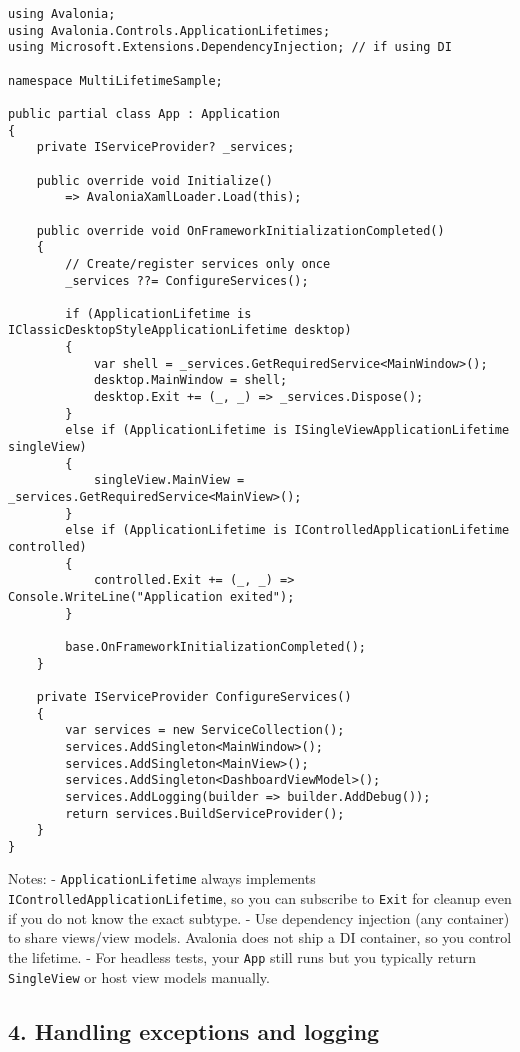 \begin{lstlisting}
using Avalonia;
using Avalonia.Controls.ApplicationLifetimes;
using Microsoft.Extensions.DependencyInjection; // if using DI

namespace MultiLifetimeSample;

public partial class App : Application
{
    private IServiceProvider? _services;

    public override void Initialize()
        => AvaloniaXamlLoader.Load(this);

    public override void OnFrameworkInitializationCompleted()
    {
        // Create/register services only once
        _services ??= ConfigureServices();

        if (ApplicationLifetime is IClassicDesktopStyleApplicationLifetime desktop)
        {
            var shell = _services.GetRequiredService<MainWindow>();
            desktop.MainWindow = shell;
            desktop.Exit += (_, _) => _services.Dispose();
        }
        else if (ApplicationLifetime is ISingleViewApplicationLifetime singleView)
        {
            singleView.MainView = _services.GetRequiredService<MainView>();
        }
        else if (ApplicationLifetime is IControlledApplicationLifetime controlled)
        {
            controlled.Exit += (_, _) => Console.WriteLine("Application exited");
        }

        base.OnFrameworkInitializationCompleted();
    }

    private IServiceProvider ConfigureServices()
    {
        var services = new ServiceCollection();
        services.AddSingleton<MainWindow>();
        services.AddSingleton<MainView>();
        services.AddSingleton<DashboardViewModel>();
        services.AddLogging(builder => builder.AddDebug());
        return services.BuildServiceProvider();
    }
}
\end{lstlisting}

Notes: - \passthrough{\lstinline!ApplicationLifetime!} always implements
\passthrough{\lstinline!IControlledApplicationLifetime!}, so you can
subscribe to \passthrough{\lstinline!Exit!} for cleanup even if you do
not know the exact subtype. - Use dependency injection (any container)
to share views/view models. Avalonia does not ship a DI container, so
you control the lifetime. - For headless tests, your
\passthrough{\lstinline!App!} still runs but you typically return
\passthrough{\lstinline!SingleView!} or host view models manually.

\subsection{4. Handling exceptions and
logging}\label{handling-exceptions-and-logging}

